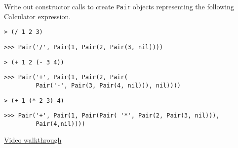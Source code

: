 \question Write out constructor calls to create {\tt Pair} objects representing
the following Calculator expression.

\begin{lstlisting}
> (/ 1 2 3)
\end{lstlisting}
\begin{solution}[0.3in]
\begin{lstlisting}
>>> Pair('/', Pair(1, Pair(2, Pair(3, nil))))
\end{lstlisting}
\end{solution}

\begin{lstlisting}
> (+ 1 2 (- 3 4))
\end{lstlisting}
\begin{solution}[0.3in]
\begin{lstlisting}
>>> Pair('+', Pair(1, Pair(2, Pair(
         Pair('-', Pair(3, Pair(4, nil))), nil))))
\end{lstlisting}
\end{solution}

\begin{lstlisting}
> (+ 1 (* 2 3) 4)
\end{lstlisting}
\begin{solution}[0.5in]
\begin{lstlisting}
>>> Pair('+', Pair(1, Pair(Pair( '*', Pair(2, Pair(3, nil))),
         Pair(4,nil))))
\end{lstlisting}
\href{https://youtu.be/zIvYrA76GRo}{Video walkthrough}
\end{solution}
